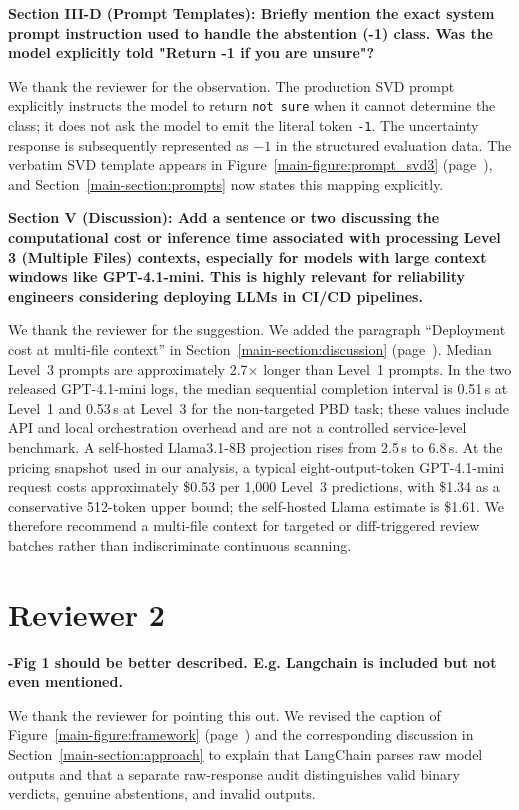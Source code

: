 \documentclass[journal,onecolumn]{IEEEtran}
\begin{document}
\textbf{Section III-D (Prompt Templates): Briefly mention the exact system prompt instruction used to handle the abstention (-1) class. Was the model explicitly told "Return -1 if you are unsure"?}

We thank the reviewer for the observation. The production SVD prompt explicitly instructs the model to return \texttt{not sure} when it cannot determine the class; it does not ask the model to emit the literal token \texttt{-1}. The uncertainty response is subsequently represented as $-1$ in the structured evaluation data. The verbatim SVD template appears in Figure~\ref{main-figure:prompt_svd3} (page~\pageref{main-figure:prompt_svd3}), and Section~\ref{main-section:prompts} now states this mapping explicitly.

\textbf{Section V (Discussion): Add a sentence or two discussing the computational cost or inference time associated with processing Level 3 (Multiple Files) contexts, especially for models with large context windows like GPT-4.1-mini. This is highly relevant for reliability engineers considering deploying LLMs in CI/CD pipelines.}

We thank the reviewer for the suggestion. We added the paragraph ``Deployment cost at multi-file context'' in Section~\ref{main-section:discussion} (page~\pageref{main-section:discussion}). Median Level~3 prompts are approximately 2.7$\times$ longer than Level~1 prompts. In the two released GPT-4.1-mini logs, the median sequential completion interval is 0.51\,s at Level~1 and 0.53\,s at Level~3 for the non-targeted PBD task; these values include API and local orchestration overhead and are not a controlled service-level benchmark. A self-hosted Llama3.1-8B projection rises from 2.5\,s to 6.8\,s. At the pricing snapshot used in our analysis, a typical eight-output-token GPT-4.1-mini request costs approximately \$0.53 per 1,000 Level~3 predictions, with \$1.34 as a conservative 512-token upper bound; the self-hosted Llama estimate is \$1.61. We therefore recommend a multi-file context for targeted or diff-triggered review batches rather than indiscriminate continuous scanning.

\section{Reviewer 2}

\textbf{-Fig 1 should be better described. E.g. Langchain is included but not even mentioned.}

We thank the reviewer for pointing this out. We revised the caption of Figure~\ref{main-figure:framework} (page~\pageref{main-figure:framework}) and the corresponding discussion in Section~\ref{main-section:approach} to explain that LangChain parses raw model outputs and that a separate raw-response audit distinguishes valid binary verdicts, genuine abstentions, and invalid outputs.
\end{document}
